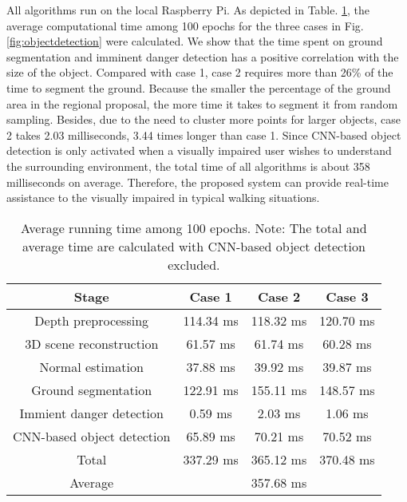 \documentclass{ieeeaccess}
\begin{document}
All algorithms run on the local Raspberry Pi. As depicted in Table. \ref{tab:computation cost}, the average computational time among 100 epochs for the three cases in Fig. \ref{fig:objectdetection} were calculated. We show that the time spent on ground segmentation and imminent danger detection has a positive correlation with the size of the object. Compared with case 1, case 2 requires more than 26\% of the time to segment the ground. Because the smaller the percentage of the ground area in the regional proposal, the more time it takes to segment it from random sampling. Besides, due to the need to cluster more points for larger objects, case 2 takes 2.03 milliseconds, 3.44 times longer than case 1. Since CNN-based object detection is only activated when a visually impaired user wishes to understand the surrounding environment, the total time of all algorithms is about 358 milliseconds on average. Therefore, the proposed system can provide real-time assistance to the visually impaired in typical walking situations.

\begin{table}[]
\centering
\caption{Average running time among 100 epochs. Note: The total and average time are calculated with CNN-based object detection excluded.}
\label{tab:computation cost}
\begin{tabular}{|c|c|c|c|}
\hline
Stage                      & Case 1  & Case 2 & Case 3 \\ \hline
Depth preprocessing        &    114.34 ms  &  118.32 ms & 120.70 ms\\ \hline
3D scene reconstruction    &   61.57 ms   & 61.74 ms & 60.28 ms\\ \hline
Normal estimation          &    37.88 ms& 39.92 ms &  39.87 ms \\ \hline
Ground segmentation            &   122.91 ms  & 155.11 ms & 148.57 ms \\ \hline
Immient danger detection &     0.59 ms&  2.03 ms &  1.06 ms \\ \hline
CNN-based object detection       &   65.89 ms  &  70.21 ms & 70.52 ms\\ \hline
Total & 337.29 ms& 365.12 ms & 370.48 ms\\ \hline
Average &\multicolumn{3}{c|}{357.68 ms}  \\ \hline
\end{tabular}
\end{table}
\end{document}
